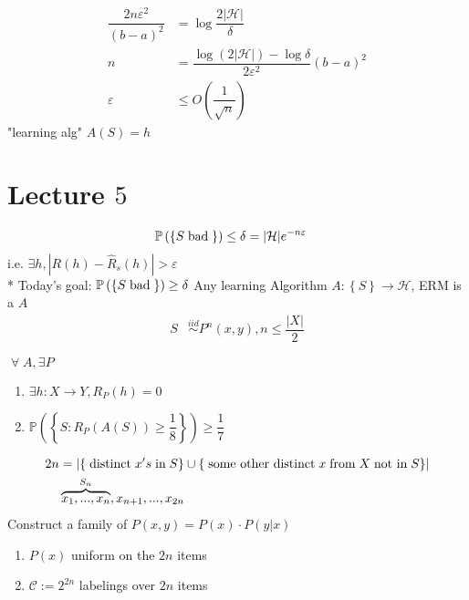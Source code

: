 \documentclass{article}
\begin{document}
\begin{align*}
\dfrac{2 n \varepsilon^{2}}{\left(b - a\right)^{2}} &=  \log \dfrac{2 | \mathcal{H} |}{\delta}
\\ n  &= \dfrac{\log \left(2 | \mathcal{H} |\right) - \log \delta}{2 \varepsilon^{2}} \left(b - a\right)^{2}
\\ \varepsilon &\leq  O\left(\dfrac{1}{\sqrt{n}}\right) 
\end{align*}
"learning alg" $A\left(S\right)  = h $
\newline \newline



\section{Lecture $5$} 
\begin{align*}
\mathbb{P}\left(\left\{S  \text{\;bad\;}\right\}\right) &\leq  \delta = | \mathcal{H} | e^{-n \varepsilon}
\end{align*}
i.e. $\exists h, \left|  R\left(h\right) - \hat{R}_{s}\left(h\right)  \right| > \varepsilon$
\\* Today's goal: $\mathbb{P}\left(\left\{S  \text{\;bad\;}\right\}\right) \geq  \delta$
\newline \newline
Any learning Algorithm $A  : \left\{S\right\} \to  \mathcal{H}$, ERM is a $A $
\begin{align*}
S  &\stackrel{iid}{\sim} P^{n}\left(x, y\right), n \leq  \dfrac{| X |}{2}
\end{align*}
\begin{thm} \label{thm:bad} 
$\;\forall\; A, \exists P$
\end{thm}
\begin{enumerate}
\item $\exists h : X \to  Y, R_{P}\left(h\right) = 0$
\item $\mathbb{P}\left(\left\{S: R_{P}\left(A\left(S\right)\right) \geq  \dfrac{1}{8}\right\}\right) \geq  \dfrac{1}{7}$
\end{enumerate}

\begin{align*}
2 n &= \left| \left\{\text{\;distinct\;} x's \text{\;in\;} S\right\} \cup \left\{\text{\;some other distinct\;} x \text{\;from\;} X \text{\;not in\;} S\right\} \right|
\\ &\overbrace{x_{1}, ..., x_{n}}^{S_{n}}, x_{n+1}, ..., x_{2n}
\end{align*}
Construct a family of $P\left(x, y\right)  = P\left(x\right) \cdot  P\left(y | x\right)$
\begin{enumerate}
\item $P\left(x\right) $ uniform on the $2 n$ items
\item $\mathcal{C} := 2^{2n}$ labelings over $2 n$ items
\end{enumerate}
\end{document}
